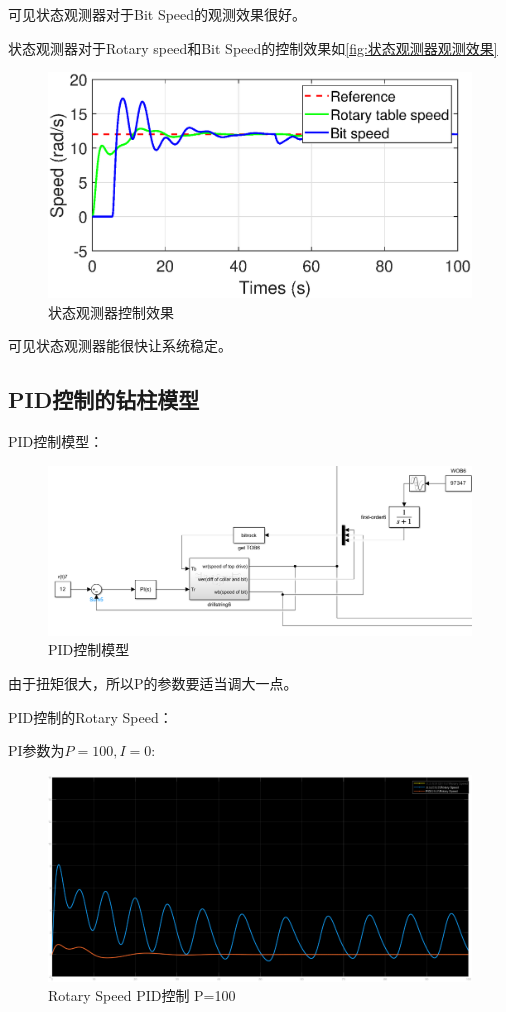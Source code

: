 \documentclass[12pt,hyperref,a4paper,UTF8]{ctexart}
\begin{document}
	可见状态观测器对于Bit Speed的观测效果很好。
	
	
	状态观测器对于Rotary speed和Bit Speed的控制效果如\autoref{fig:状态观测器观测效果}
	
	\begin{figure}[!htbp]
		\centering
		\includegraphics[width=0.7\linewidth]{figures/状态观测器控制效果}
		\caption{状态观测器控制效果}
		\label{fig:状态观测器控制效果}
	\end{figure}
	
	
	可见状态观测器能很快让系统稳定。
	
	\newpage
	
	\subsection{PID控制的钻柱模型}
	
	PID控制模型：
	
	\begin{figure}[!htbp]
		\centering
		\includegraphics[width=0.7\linewidth]{figures/PID控制模型}
		\caption{PID控制模型}
		\label{fig:PID控制模型}
	\end{figure}
	
	由于扭矩很大，所以P的参数要适当调大一点。
	
	
	PID控制的Rotary Speed：
	
	
	
	PI参数为$P=100,I=0$:
	
	
	
	\begin{figure}[!htbp]
		\centering
		\includegraphics[width=0.7\linewidth]{figures/Rotary_Speed_PID控制_P100}
		\caption{Rotary Speed PID控制 P=100}
		\label{fig:Rotary_Speed_PID控制_P100}
	\end{figure}
	
\end{document}
